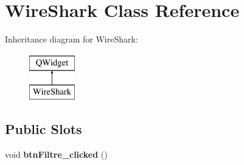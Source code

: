 \hypertarget{class_wire_shark}{\section{Wire\-Shark Class Reference}
\label{class_wire_shark}
}
Inheritance diagram for Wire\-Shark\-:\begin{figure}[H]
\begin{center}
\leavevmode
\includegraphics[height=2.000000cm]{class_wire_shark}
\end{center}
\end{figure}
\subsection*{Public Slots}
\begin{DoxyCompactItemize}
\item 
\hypertarget{class_wire_shark_abaab15d4936015653c81e8fb870d3327}{void {\bfseries btn\-Filtre\-\_\-clicked} ()}\label{class_wire_shark_abaab15d4936015653c81e8fb870d3327}

\end{DoxyCompactItemize}
